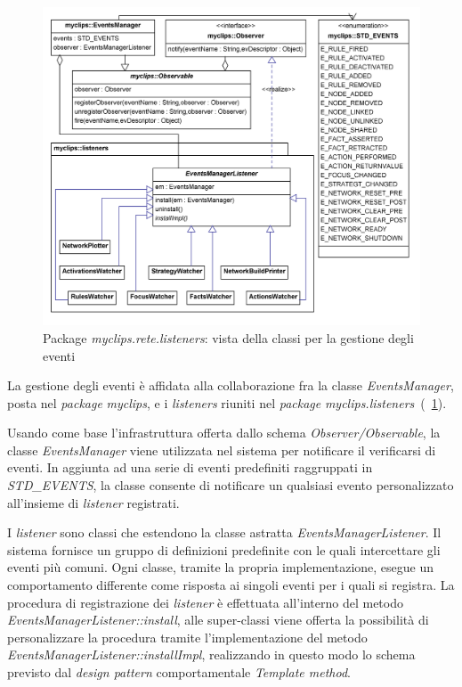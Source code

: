 \begin{figure}[h]
\centering
\includegraphics[width=1\textwidth]{Immagini/Capitolo3/Classi/myclips_EventsManager-Listeners.png}
\caption{Package \emph{myclips.rete.listeners}: vista della classi per la gestione degli eventi}\label{fig:class-myclips-eventsmanager}
\end{figure}

La gestione degli eventi è affidata alla collaborazione fra la classe \emph{EventsManager}, posta nel \emph{package} \emph{myclips}, e i \emph{listeners} riuniti nel \emph{package} \emph{myclips.listeners}~(\figurename~\ref{fig:class-myclips-eventsmanager}).

Usando come base l'infrastruttura offerta dallo schema \emph{Observer/Observable}, la classe \emph{EventsManager} viene utilizzata nel sistema per notificare il verificarsi di eventi. In aggiunta ad una serie di eventi predefiniti raggruppati in \emph{STD\_EVENTS}, la classe consente di notificare un qualsiasi evento personalizzato all'insieme di \emph{listener} registrati.

I \emph{listener} sono classi che estendono la classe astratta \emph{EventsManagerListener}. Il sistema fornisce un gruppo di definizioni predefinite con le quali intercettare gli eventi più comuni. Ogni classe, tramite la propria implementazione, esegue un comportamento differente come risposta ai singoli eventi per i quali si registra. La procedura di registrazione dei \emph{listener} è effettuata all'interno del metodo \emph{EventsManagerListener::install}, alle super-classi viene offerta la possibilità di personalizzare la procedura tramite l'implementazione del metodo \emph{EventsManagerListener::installImpl}, realizzando in questo modo lo schema previsto dal \emph{design pattern} comportamentale \emph{Template method}.

